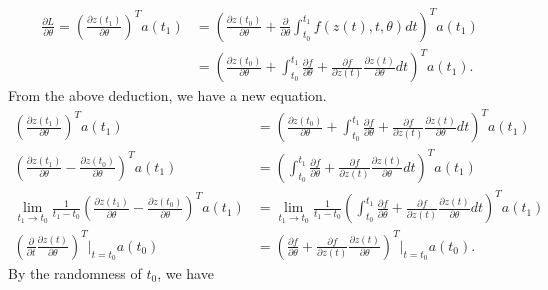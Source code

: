 \begin{align*}
    \frac{\partial L}{\partial \theta} = \left(\frac{\partial z(t_1)}{\partial \theta}\right)^Ta(t_1) &= \left(\frac{\partial z(t_0)}{\partial \theta}+\frac{\partial}{\partial \theta}\int_{t_0}^{t_1}f(z(t),t,\theta)dt\right)^Ta(t_1) \\
                                                                                                                   &= \left(\frac{\partial z(t_0)}{\partial \theta}+\int_{t_0}^{t_1}\frac{\partial f}{\partial \theta}+\frac{\partial f}{\partial z(t)}\frac{\partial z(t)}{\partial \theta}dt\right)^Ta(t_1). 
\end{align*}
From the above deduction, we have a new equation.
\begin{align*}
    \left(\frac{\partial z(t_1)}{\partial \theta}\right)^Ta(t_1) &= \left(\frac{\partial z(t_0)}{\partial \theta}+\int_{t_0}^{t_1}\frac{\partial f}{\partial \theta}+\frac{\partial f}{\partial z(t)}\frac{\partial z(t)}{\partial \theta}dt\right)^Ta(t_1) \\
    (\frac{\partial z(t_1)}{\partial \theta} - \frac{\partial z(t_0)}{\partial \theta})^Ta(t_1) &= \left(\int_{t_0}^{t_1}\frac{\partial f}{\partial \theta}+\frac{\partial f}{\partial z(t)}\frac{\partial z(t)}{\partial \theta}dt\right)^Ta(t_1) \\
    \lim_{t_1\rightarrow t_0}\frac{1}{t_1-t_0}(\frac{\partial z(t_1)}{\partial \theta} - \frac{\partial z(t_0)}{\partial \theta})^Ta(t_1) &= \lim_{t_1\rightarrow t_0}\frac{1}{t_1-t_0}\left(\int_{t_0}^{t_1}\frac{\partial f}{\partial \theta}+\frac{\partial f}{\partial z(t)}\frac{\partial z(t)}{\partial \theta}dt\right)^Ta(t_1) \\
    \left(\frac{\partial}{\partial t}\frac{\partial z(t)}{\partial\theta}\right)^T\bigg|_{t=t_0}a(t_0) &= \left(\frac{\partial f}{\partial \theta}+\frac{\partial f}{\partial z(t)}\frac{\partial z(t)}{\partial \theta}\right)^T\bigg|_{t=t_0}a(t_0).
\end{align*}
By the randomness of $t_0$, we have 
